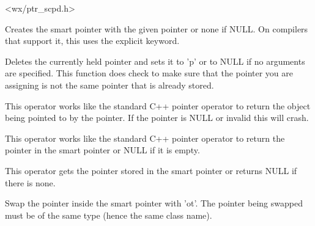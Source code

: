 
<wx/ptr_scpd.h>


\rtfsp




Creates the smart pointer with the given pointer or none if NULL.  On
compilers that support it, this uses the explicit keyword.



Deletes the currently held pointer and sets it to 'p' or to NULL if no 
arguments are specified. This function does check to make sure that the
pointer you are assigning is not the same pointer that is already stored.



This operator works like the standard C++ pointer operator to return the object
being pointed to by the pointer.  If the pointer is NULL or invalid this will
crash.



This operator works like the standard C++ pointer operator to return the pointer
in the smart pointer or NULL if it is empty.



This operator gets the pointer stored in the smart pointer or returns NULL if
there is none.



Swap the pointer inside the smart pointer with 'ot'.  The pointer being swapped
must be of the same type (hence the same class name).

 	  	 
